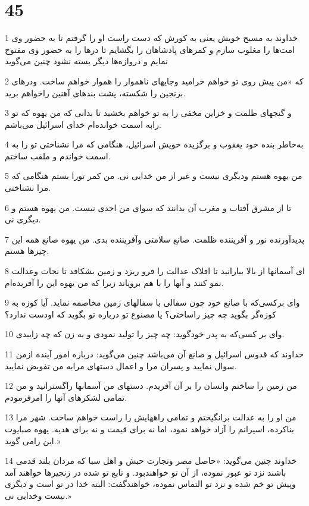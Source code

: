 \chapter{45}

\par 1 خداوند به مسیح خویش یعنی به کورش که دست راست او را گرفتم تا به حضور وی امت‌ها را مغلوب سازم و کمرهای پادشاهان را بگشایم تا درها را به حضور وی مفتوح نمایم و دروازه‌ها دیگر بسته نشود چنین می‌گوید
\par 2 که «من پیش روی تو خواهم خرامید وجایهای ناهموار را هموار خواهم ساخت. ودرهای برنجین را شکسته، پشت بندهای آهنین راخواهم برید.
\par 3 و گنجهای ظلمت و خزاین مخفی را به تو خواهم بخشید تا بدانی که من یهوه که تو رابه اسمت خوانده‌ام خدای اسرائیل می‌باشم.
\par 4 به‌خاطر بنده خود یعقوب و برگزیده خویش اسرائیل، هنگامی که مرا نشناختی تو را به اسمت خواندم و ملقب ساختم.
\par 5 من یهوه هستم ودیگری نیست و غیر از من خدایی نی. من کمر تورا بستم هنگامی که مرا نشناختی.
\par 6 تا از مشرق آفتاب و مغرب آن بدانند که سوای من احدی نیست. من یهوه هستم و دیگری نی.
\par 7 پدیدآورنده نور و آفریننده ظلمت. صانع سلامتی وآفریننده بدی. من یهوه صانع همه این چیزها هستم.
\par 8 ‌ای آسمانها از بالا ببارانید تا افلاک عدالت را فرو ریزد و زمین بشکافد تا نجات وعدالت نمو کنند و آنها را با هم برویاند زیرا که من یهوه این را آفریده‌ام.
\par 9 وای برکسی‌که با صانع خود چون سفالی با سفالهای زمین مخاصمه نماید. آیا کوزه به کوزه‌گر بگوید چه چیز راساختی؟ یا مصنوع تو درباره تو بگوید که اودست ندارد؟
\par 10 وای بر کسی‌که به پدر خودگوید: چه چیز را تولید نمودی و به زن که چه زاییدی.
\par 11 خداوند که قدوس اسرائیل و صانع آن می‌باشد چنین می‌گوید: درباره امور آینده ازمن سوال نمایید و پسران مرا و اعمال دستهای مرابه من تفویض نمایید.
\par 12 من زمین را ساختم وانسان را بر آن آفریدم. دستهای من آسمانها راگسترانید و من تمامی لشکرهای آنها را امرفرمودم.
\par 13 من او را به عدالت برانگیختم و تمامی راههایش را راست خواهم ساخت. شهر مرا بناکرده، اسیرانم را آزاد خواهد نمود، اما نه برای قیمت و نه برای هدیه. یهوه صبایوت این رامی گوید.»
\par 14 خداوند چنین می‌گوید: «حاصل مصر وتجارت حبش و اهل سبا که مردان بلند قدمی باشند نزد تو عبور نموده، از آن تو خواهندبود. و تابع تو شده در زنجیرها خواهند آمد وپیش تو خم شده و نزد تو التماس نموده، خواهندگفت: البته خدا در تو است و دیگری نیست وخدایی نی.»
